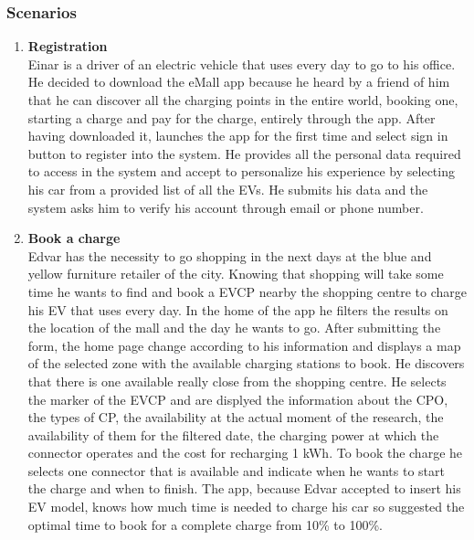 \subsubsection{Scenarios}
\begin{enumerate}[label=\textbf{\Alph*}.]
      \item \textbf{Registration} \\
            Einar is a driver of an electric vehicle that uses every day to go to his
            office. He decided to download the eMall app because he heard by a friend
            of him that he can discover all the charging points in the entire world,
            booking one, starting a charge and pay for the charge, entirely through
            the app. After having downloaded it, launches the app for the first time
            and select sign in button to register into the system. He provides all
            the personal data required to access in the system and accept to personalize
            his experience by selecting his car from a provided list of all the EVs.
            He submits his data and the system asks him to verify his account through email or phone number.
      \item \textbf{Book a charge} \\
            Edvar has the necessity to go shopping in the next days at the blue and yellow furniture retailer of the city. Knowing
            that shopping will take some time he wants to find and book a EVCP nearby the shopping centre to charge his EV that uses every day.
            In the home of the app he filters the results on the location of the mall and the day he wants to go. 
            After submitting the form, the home page change according to his information and displays
            a map of the selected zone with the available charging stations to book. He discovers that there is one available
            really close from the shopping centre. He selects the marker of the EVCP and are displyed the information about the CPO,
            the types of CP, the availability at the actual moment of the research, the availability of them for the filtered date,
            the charging power at which the connector operates and the cost for recharging 1 kWh.
            To book the charge he selects one connector that is available and indicate when he wants to start the charge
            and when to finish. The app, because Edvar accepted to insert his EV model, knows how much time is needed to charge his car so suggested
            the optimal time to book for a complete charge from 10\% to 100\%.

\end{enumerate}
